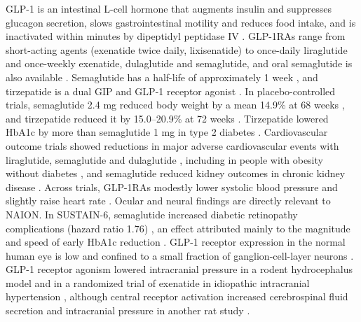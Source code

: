 \documentclass[journal]{IEEEtran}
\begin{document}
GLP-1 is an intestinal L-cell hormone that augments insulin and
suppresses glucagon secretion, slows gastrointestinal motility and
reduces food intake, and is inactivated within minutes by dipeptidyl
peptidase IV \cite{p17928588, p29617641, p22945360}. GLP-1RAs range
from short-acting agents (exenatide twice daily, lixisenatide) to
once-daily liraglutide and once-weekly exenatide, dulaglutide and
semaglutide, and oral semaglutide is also available
\cite{p22945360, p33068776}. Semaglutide has a half-life of
approximately 1 week \cite{p27633186}, and tirzepatide is a dual GIP
and GLP-1 receptor agonist \cite{p35658024}. In placebo-controlled
trials, semaglutide 2.4 mg reduced body weight by a mean 14.9\% at 68
weeks \cite{p33567185}, and tirzepatide reduced it by 15.0--20.9\% at
72 weeks \cite{p35658024}. Tirzepatide lowered HbA1c by more than
semaglutide 1 mg in type 2 diabetes \cite{p34170647}. Cardiovascular
outcome trials showed reductions in major adverse cardiovascular events
with liraglutide, semaglutide and dulaglutide
\cite{p27295427, p27633186, p31189511, p31422062}, including in people
with obesity without diabetes \cite{p37952131}, and semaglutide reduced
kidney outcomes in chronic kidney disease \cite{p38785209}. Across
trials, GLP-1RAs modestly lower systolic blood pressure and slightly
raise heart rate \cite{p26358202}. Ocular and neural findings are
directly relevant to NAION. In SUSTAIN-6, semaglutide increased diabetic
retinopathy complications (hazard ratio 1.76) \cite{p27633186}, an
effect attributed mainly to the magnitude and speed of early HbA1c
reduction \cite{p29178519}. GLP-1 receptor expression in the normal
human eye is low and confined to a small fraction of ganglion-cell-layer
neurons \cite{p29707863}. GLP-1 receptor agonism lowered intracranial
pressure in a rodent hydrocephalus model \cite{p28835515} and in a
randomized trial of exenatide in idiopathic intracranial hypertension
\cite{p36907221}, although central receptor activation increased
cerebrospinal fluid secretion and intracranial pressure in another rat
study \cite{p40275284}.
\end{document}
